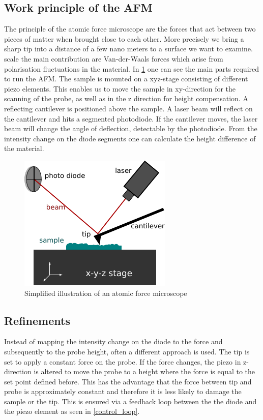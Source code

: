 \documentclass[paper=a4,fontsize=10pt,DIV=18,twocolumn,parskip=half]{scrartcl}
\numberwithin{equation}{section}    %
\begin{document}
\subsection{Work principle of the AFM}
The principle of the atomic force microscope are the forces that act between two 
pieces of matter when brought close to each other. More precisely we bring a 
sharp tip into a distance of a few nano meters to  a surface we want to examine.  
scale the main contribution are Van-der-Waals forces which arise from 
polarisation fluctuations in the material.
In \cref{afm_scheme} one can see the main parts required to run the AFM. 
The sample is mounted on a xyz-stage consisting of different piezo elements. 
This enables us to move the sample in xy-direction for the scanning of the 
probe, as well as in the z direction for height compensation. A reflecting 
cantilever is positioned above the sample. A laser beam will reflect on the 
cantilever and hits a segmented photodiode. If the cantilever moves, the 
laser beam will change the angle of deflection, detectable by the photodiode.
From the intensity change on the diode segments one can calculate the height 
difference of the material.

\begin{figure}
    \centering
    \includegraphics{Bilder/afm_scheme.pdf}
    \caption{Simplified illustration of an atomic force microscope}
    \label{afm_scheme}
\end{figure}

\subsection{Refinements}
Instead of mapping the intensity change on the diode to the force and 
subsequently to the probe height, often a different approach is used. The tip is 
set to apply a constant force on the probe. If the force changes, the piezo in 
z-direction is altered to move the probe to a height where the force is equal to 
the set point defined before. This has the advantage that the force between tip 
and probe is approximately constant and therefore it is less likely to damage 
the sample or the tip. This is ensured via a feedback loop between the the diode 
and the piezo element as seen in \cref{control_loop}.
\end{document}
